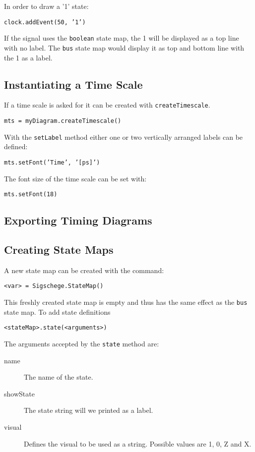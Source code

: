 \documentclass[11pt]{article}
\begin{document}
In order to draw a '1' state:

\texttt{clock.addEvent(50, '1')}

If the signal uses the \texttt{boolean} state map, the 1 will be displayed as a
top line with no label. The \texttt{bus} state map would display it as top and
bottom line with the 1 as a label.


\subsection{Instantiating a Time Scale}
\label{sec:tis}
If a time scale is asked for it can be created with \texttt{createTimescale}. 

\texttt{mts = myDiagram.createTimescale()}

With the \texttt{setLabel} method either one or two vertically arranged labels can
be defined: 

\texttt{mts.setFont('Time', '[ps]')}

The font size of the time scale can be set with:

\texttt{mts.setFont(18)}



\subsection{Exporting Timing Diagrams}
\label{sec:exp}

\subsection{Creating State Maps}
\label{sec:tis}

A new state map can be created with the command:

\begin{center}
  \texttt{<var> = Sigschege.StateMap()}
\end{center}

This freshly created state map is empty and thus has the same effect as the
\texttt{bus} state map. To add state definitions

\begin{center}
  \texttt{<stateMap>.state(<arguments>)}
\end{center}

The arguments accepted by the \texttt{state} method are:

\begin{description}
\item[name] The name of the state.
\item[showState] The state string will we printed as a label.
\item[visual] Defines the visual to be used as a string. Possible values are 1, 0, Z and X.
\end{description}
\end{document}
